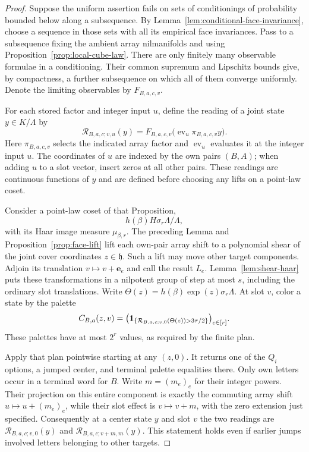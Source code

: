 \begin{proof}
Suppose the uniform assertion fails on sets of conditionings of
probability bounded below along a subsequence.  By
Lemma~\ref{lem:conditional-face-invariance}, choose a sequence in
those sets with all its empirical face invariances.  Pass to a
subsequence fixing the ambient array nilmanifolds and using
Proposition~\ref{prop:local-cube-law}.  There are only finitely many
observable formulae in a conditioning.  Their common supremum
and Lipschitz bounds give, by compactness, a further subsequence
on which all of them converge uniformly.  Denote the limiting
observables by $F_{B,a,c,v}$.

For each stored factor and integer input $u$, define the reading of a
joint state $y\in K/\Lambda$ by
\begin{equation}\label{eq:alignment-intrinsic-reading}
 \mathcal R_{B,a,c;v,u}(y)
 =F_{B,a,c,v}\bigl(\operatorname{ev}_u\pi_{B,a,c,v}y\bigr).
\end{equation}
Here $\pi_{B,a,c,v}$ selects the indicated array factor and
$\operatorname{ev}_u$ evaluates it at the integer input $u$.
The coordinates of $u$ are indexed by the own pairs $(B,A)$;
when adding $u$ to a slot vector, insert zeros at all other pairs.
These readings are continuous functions of $y$ and are defined
before choosing any lifts on a point-law coset.

Consider a point-law coset of that Proposition,
\[
 h(\beta)H\sigma_r\Lambda/\Lambda,
\]
with its Haar image measure $\mu_{\beta,r}$.  The preceding Lemma
and Proposition~\ref{prop:face-lift} lift each own-pair array
shift to a polynomial shear of the joint cover coordinates
$z\in\mathfrak h$.  Such a lift may move other target components.
Adjoin its translation $v\mapsto v+\mathbf e_e$ and call the
result $L_e$.  Lemma~\ref{lem:shear-haar} puts these transformations
in a nilpotent group of step at most $s$, including the ordinary
slot translations.  Write $\Theta(z)=h(\beta)\exp(z)\sigma_r\Lambda$.
At slot $v$, color a state by the palette
\begin{equation}\label{eq:alignment-limit-palette}
 C_{B,a}(z,v)=
 \bigl(\mathbf 1_{\{\mathcal R_{B,a,c;v,0}(\Theta(z))>3\tau/2\}}\bigr)_{c\in[r]}.
\end{equation}
These palettes have at most $2^r$ values, as required by the finite plan.

Apply that plan pointwise starting at any $(z,0)$.  It returns
one of the $Q_i$ options, a jumped center, and terminal palette
equalities there.  Only own letters occur in a terminal word for
$B$.  Write $m=(m_e)_e$ for their integer powers.  Their projection on
this entire component is exactly the commuting array shift
$u\mapsto u+(m_e)_e$, while their slot effect is
$v\mapsto v+m$, with the zero extension just specified.
Consequently at a center state $y$ and slot $v$ the two readings
are $\mathcal R_{B,a,c;v,0}(y)$ and
$\mathcal R_{B,a,c;v+m,m}(y)$.  This statement holds even if earlier
jumps involved letters belonging to other targets.


\end{proof}
